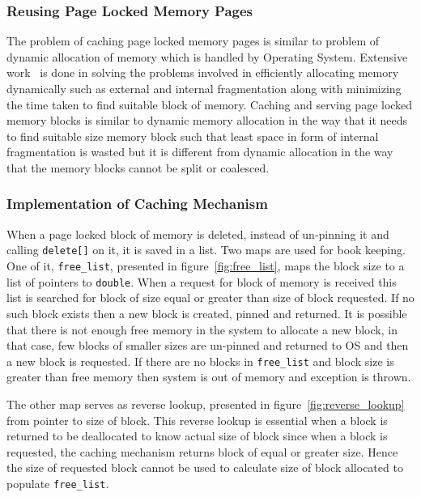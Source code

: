 \subsubsection{Reusing Page Locked Memory Pages}
The problem of caching page locked memory pages is similar to problem of dynamic
allocation of memory which is handled by Operating System. Extensive work~\cite{Wilson1995}
is done in solving the problems involved in efficiently allocating memory dynamically such
as external and internal fragmentation along with minimizing the time taken to find
suitable block of memory. Caching and serving page locked memory blocks
is similar to dynamic memory allocation in the way that it needs to find suitable
size memory block such that least space in form of internal fragmentation is wasted
but it is different from dynamic allocation in the way that the memory blocks cannot
be split or coalesced.

\subsubsection{Implementation of Caching Mechanism}
When a page locked block of memory is deleted, instead of un-pinning it and calling
\texttt{delete[]} on it, it is saved in a list. Two maps are used for book
keeping. One of it, \texttt{free\_list}, presented in figure~\ref{fig:free_list},
maps the block size to a list of pointers to \texttt{double}. When a request for
block of memory is received this list is searched for block of size equal or
greater than size of block requested. If no such block exists then a new block
is created, pinned and returned. It is possible that there is not enough free
memory in the system to allocate a new block, in that case, few blocks of smaller
sizes are un-pinned and returned to OS and then a new block is requested. If there
are no blocks in \texttt{free\_list} and block size is greater than free memory
then system is out of memory and exception is thrown.

The other map serves as reverse lookup, presented in figure~\ref{fig:reverse_lookup}
from pointer to size of block. This reverse lookup is essential when a block is
returned to be deallocated to know actual size of block since when a block is requested, the caching mechanism
returns block of equal or greater size. Hence the size of requested block cannot
be used to calculate size of block allocated to populate \texttt{free\_list}.

